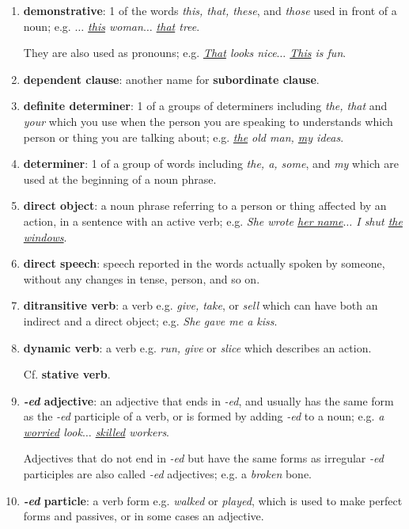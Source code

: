 \documentclass[oneside]{book}
\numberwithin{equation}{section}
\begin{document}
\begin{enumerate}
    \textit{Give, have}, and \textit{take} are commonly used as delexical verbs; e.g. \textit{She \underline{gave} a small cry}.
    
    \textit{I've \underline{had} a bath}.
    \item \textbf{demonstrative}: 1 of the words \textit{this, that, these}, and \textit{those} used in front of a noun; e.g. \textit{$\ldots$ \underline{this} woman$\ldots$ \underline{that} tree}.
    
    They are also used as pronouns; e.g. \textit{\underline{That} looks nice$\ldots$ \underline{This} is fun}.
    \item \textbf{dependent clause}: another name for \textbf{subordinate clause}.
    \item \textbf{definite determiner}: 1 of a groups of determiners including \textit{the, that} and \textit{your} which you use when the person you are speaking to understands which person or thing you are talking about; e.g. \textit{\underline{the} old man, \underline{my} ideas}.
    \item \textbf{determiner}: 1 of a group of words including \textit{the, a, some}, and \textit{my} which are used at the beginning of a noun phrase.
    \item \textbf{direct object}: a noun phrase referring to a person or thing affected by an action, in a sentence with an active verb; e.g. \textit{She wrote \underline{her name}$\ldots$ I shut \underline{the windows}}.
    \item \textbf{direct speech}: speech reported in the words actually spoken by someone, without any changes in tense, person, and so on.
    \item \textbf{ditransitive verb}: a verb e.g. \textit{give, take}, or \textit{sell} which can have both an indirect and a direct object; e.g. \textit{She gave me a kiss}.
    \item \textbf{dynamic verb}: a verb e.g. \textit{run, give} or \textit{slice} which describes an action.
    
    Cf. \textbf{stative verb}.
    \item \textbf{\textit{-ed} adjective}: an adjective that ends in \textit{-ed}, and usually has the same form as the \textit{-ed} participle of a verb, or is formed by adding \textit{-ed} to a noun; e.g. \textit{a \underline{worried} look$\ldots$ \underline{skilled} workers}.
    
    Adjectives that do not end in \textit{-ed} but have the same forms as irregular \textit{-ed} participles are also called \textit{-ed} adjectives; e.g. a \textit{broken} bone.
    \item \textbf{\textit{-ed} particle}: a verb form e.g. \textit{walked} or \textit{played}, which is used to make perfect forms and passives, or in some cases an adjective.
    

\end{enumerate}
\end{document}
